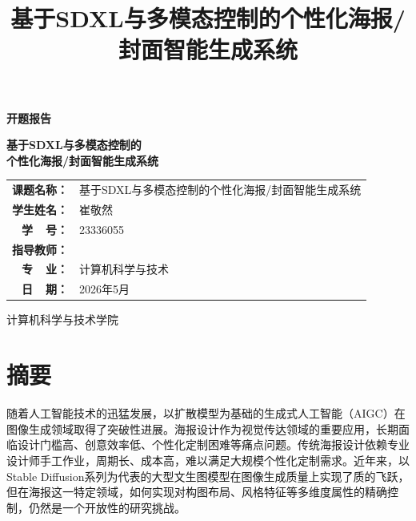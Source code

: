 \documentclass[12pt,a4paper]{ctexart}
\title{\heiti\zihao{2} \textbf{基于SDXL与多模态控制的个性化海报/封面智能生成系统}}
\author{}
\date{}
\newcommand{\aigc}{AIGC}
\begin{document}
\begin{titlepage}
\centering
\vspace*{2cm}

{\songti{} \textbf{开题报告}}

\vspace{1.5cm}

{\heiti{} \textbf{基于SDXL与多模态控制的}}\\[0.5cm]
{\heiti{} \textbf{个性化海报/封面智能生成系统}}

\vspace{2cm}

{
\songti{}
\begin{tabular}{rl}
\textbf{课题名称：} & 基于SDXL与多模态控制的个性化海报/封面智能生成系统 \\
\textbf{学生姓名：} &  崔敬然\\
\textbf{学\quad \ \ 号：} &  23336055\\
\textbf{指导教师：} &  \\
\textbf{专\quad \ \ 业：} & 计算机科学与技术 \\
\textbf{日\quad \ \ 期：} & 2026年5月 \\
\end{tabular}
}

\vspace{2cm}

{\songti{} 计算机科学与技术学院}

\end{titlepage}

\newpage
\section*{\centering \Large 摘\quad 要}

\vspace{1em}

随着人工智能技术的迅猛发展，以扩散模型为基础的生成式人工智能（\aigc）在图像生成领域取得了突破性进展。海报设计作为视觉传达领域的重要应用，长期面临设计门槛高、创意效率低、个性化定制困难等痛点问题。传统海报设计依赖专业设计师手工作业，周期长、成本高，难以满足大规模个性化定制需求。近年来，以Stable Diffusion系列为代表的大型文生图模型在图像生成质量上实现了质的飞跃，但在海报这一特定领域，如何实现对构图布局、风格特征等多维度属性的精确控制，仍然是一个开放性的研究挑战。
\end{document}
